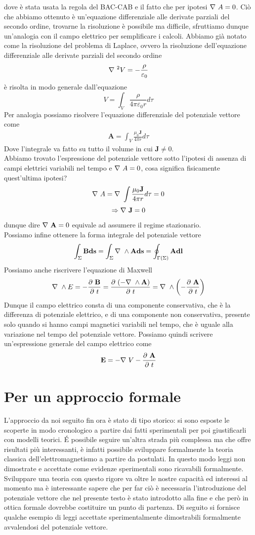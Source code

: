 \documentclass[
10pt, %
a4paper, %
oneside, %
headinclude,footinclude, %
BCOR5mm, %
]{scrartcl}
\begin{document}
dove è stata usata la regola del BAC-CAB e il fatto che per ipotesi \(\nabla\  A = 0\). Ciò che abbiamo ottenuto è un'equazione differenziale alle derivate parziali del secondo ordine, trovarne la risoluzione è possibile ma difficile, sfruttiamo dunque un'analogia con il campo elettrico per semplificare i calcoli. Abbiamo già notato come la risoluzione del problema di Laplace, ovvero la risoluzione dell'equazione differenziale alle derivate parziali del secondo ordine
\[\nabla\ ^2V = -\frac{\rho}{\varepsilon_0}\]
è risolta in modo generale dall'equazione
\[V = \int_V \frac{\rho}{4\pi\varepsilon_0 r}d\tau\] 
Per analogia possiamo risolvere l'equazione differenziale del potenziale vettore come
\begin{align}\label{eq:potenzialevettore}
	\mathbf{A} = \int_V \frac{\mu_0 \mathbf{J}}{4\pi r}d\tau
\end{align}
Dove l'integrale va fatto su tutto il volume in cui \(\mathbf{J}\neq 0\).\\
Abbiamo trovato l'espressione del potenziale vettore sotto l'ipotesi di assenza di campi elettrici variabili nel tempo e \(\nabla\  A = 0\), cosa significa fisicamente quest'ultima ipotesi? 
\[\nabla\  A = \nabla\  \int \frac{\mu_0 \mathbf{J}}{4\pi r}d\tau = 0\]
\[\Rightarrow \nabla\  \mathbf{J} = 0  \]
dunque dire \(\nabla\ \mathbf{A} = 0\) equivale ad assumere il regime stazionario.\\
Possiamo infine ottenere la forma integrale del potenziale vettore 
\[\int_{\Sigma} \mathbf{B}\mathbf{ds} = \int_{\Sigma} \nabla\ \wedge \mathbf{A}\mathbf{ds} = \oint_{\Gamma(\Sigma)} \mathbf{A}\mathbf{dl}\]
Possiamo anche riscrivere l'equazione di Maxwell
\[\nabla\ \wedge E = -\frac{\partial\  \mathbf{B}}{\partial\  t} = \frac{\partial\  (-\nabla\ \wedge\mathbf{A})}{\partial\  t} = \nabla\ \wedge\left(-\frac{\partial\  \mathbf{A}}{\partial\  t}\right)\]
Dunque il campo elettrico consta di una componente conservativa, che è la differenza di potenziale elettrico, e di una componente non conservativa, presente solo quando si hanno campi magnetici variabili nel tempo, che è uguale alla variazione nel tempo del potenziale vettore. Possiamo quindi scrivere un'espressione generale del campo elettrico come
\[\mathbf{E} = -\nabla\  V - \frac{\partial\  \mathbf{A}}{\partial\  t}\]
\section{Per un approccio formale}
L'approccio da noi seguito fin ora è stato di tipo storico: si sono esposte le scoperte in modo cronologico a partire dai fatti sperimentali per poi giustificarli con modelli teorici. \'E possibile seguire un'altra strada più complessa ma che offre risultati più interessanti, è infatti possibile sviluppare formalmente la teoria classica dell'elettromagnetismo a partire da postulati. In questo modo leggi non dimostrate e accettate come evidenze sperimentali sono ricavabili formalmente. Sviluppare una teoria con questo rigore va oltre le nostre capacità ed interessi al momento ma è interessante sapere che per far ciò è necessaria l'introduzione del potenziale vettore che nel presente testo è stato introdotto alla fine e che però in ottica formale dovrebbe costituire un punto di partenza. Di seguito si fornisce qualche esempio di leggi accettate sperimentalmente dimostrabili formalmente avvalendosi del potenziale vettore.
\end{document}

